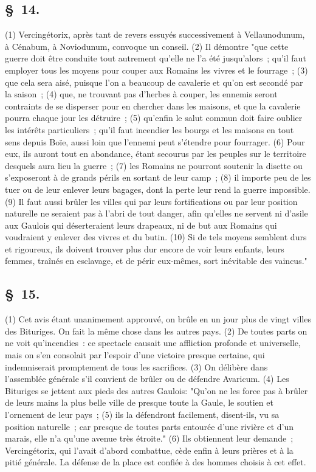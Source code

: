 \documentclass[french,twoside]{book} %
\begin{document}
\subsection[{§ 14.}]{ \textsc{§ 14.} }
\noindent (1) Vercingétorix, après tant de revers essuyés successivement à Vellaunodunum, à Cénabum, à Noviodunum, convoque un conseil. (2) Il démontre "que cette guerre doit être conduite tout autrement qu’elle ne l’a été jusqu’alors ; qu’il faut employer tous les moyens pour couper aux Romains les vivres et le fourrage ; (3) que cela sera aisé, puisque l’on a beaucoup de cavalerie et qu’on est secondé par la saison ; (4) que, ne trouvant pas d’herbes à couper, les ennemis seront contraints de se disperser pour en chercher dans les maisons, et que la cavalerie pourra chaque jour les détruire ; (5) qu’enfin le salut commun doit faire oublier les intérêts particuliers ; qu’il faut incendier les bourgs et les maisons en tout sens depuis Boïe, aussi loin que l’ennemi peut s’étendre pour fourrager. (6) Pour eux, ils auront tout en abondance, étant secourus par les peuples sur le territoire desquels aura lieu la guerre ; (7) les Romains ne pourront soutenir la disette ou s’exposeront à de grands périls en sortant de leur camp ; (8) il importe peu de les tuer ou de leur enlever leurs bagages, dont la perte leur rend la guerre impossible. (9) Il faut aussi brûler les villes qui par leurs fortifications ou par leur position naturelle ne seraient pas à l’abri de tout danger, afin qu’elles ne servent ni d’asile aux Gaulois qui déserteraient leurs drapeaux, ni de but aux Romains qui voudraient y enlever des vivres et du butin. (10) Si de tels moyens semblent durs et rigoureux, ils doivent trouver plus dur encore de voir leurs enfants, leurs femmes, traînés en esclavage, et de périr eux-mêmes, sort inévitable des vaincus."
\subsection[{§ 15.}]{ \textsc{§ 15.} }
\noindent (1) Cet avis étant unanimement approuvé, on brûle en un jour plus de vingt villes des Bituriges. On fait la même chose dans les autres pays. (2) De toutes parts on ne voit qu’incendies : ce spectacle causait une affliction profonde et universelle, mais on s’en consolait par l’espoir d’une victoire presque certaine, qui indemniserait promptement de tous les sacrifices. (3) On délibère dans l’assemblée générale s’il convient de brûler ou de défendre Avaricum. (4) Les Bituriges se jettent aux pieds des autres Gaulois: "Qu'on ne les force pas à brûler de leurs mains la plus belle ville de presque toute la Gaule, le soutien et l’ornement de leur pays ; (5) ils la défendront facilement, disent-ils, vu sa position naturelle ; car presque de toutes parts entourée d’une rivière et d’un marais, elle n’a qu’une avenue très étroite." (6) Ils obtiennent leur demande ; Vercingétorix, qui l’avait d’abord combattue, cède enfin à leurs prières et à la pitié générale. La défense de la place est confiée à des hommes choisis à cet effet.
\end{document}
